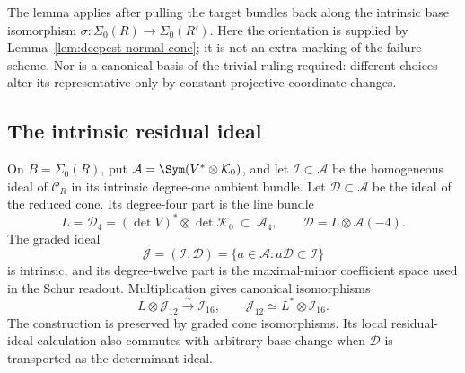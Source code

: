 The lemma applies after pulling the target bundles back along the
intrinsic base isomorphism \(\sigma:\Sigma_0(R)\to\Sigma_0(R')\).
Here the orientation is supplied by
Lemma~\ref{lem:deepest-normal-cone}; it is not an extra marking of
the failure scheme.  Nor is a canonical basis of the trivial ruling
required: different choices alter its representative only by constant
projective coordinate changes.

\subsection{The intrinsic residual ideal}

\begin{lemma}
\label{lem:intrinsic-residual-ideal}
On \(B=\Sigma_0(R)\), put
\(\mathcal A=\Sym(V^*\otimes\mathcal K_0)\), and let
\(\mathcal I\subset\mathcal A\) be the homogeneous ideal of
\(\mathscr C_R\) in its intrinsic degree-one ambient bundle.
Let \(\mathcal D\subset\mathcal A\) be the ideal of the reduced
cone.  Its degree-four part is the line bundle
\begin{equation}\label{eq:determinant-line-bundle}
 L=\mathcal D_4=(\det V)^*\otimes\det\mathcal K_0
                  \ \subset\ \mathcal A_4,
 \qquad \mathcal D=L\otimes\mathcal A(-4).
\end{equation}
The graded ideal
\begin{equation}\label{eq:intrinsic-colon-readout}
 \mathcal J=(\mathcal I:\mathcal D)
   =\{a\in\mathcal A:a\mathcal D\subset\mathcal I\}
\end{equation}
is intrinsic, and its degree-twelve part is the maximal-minor
coefficient space used in the Schur readout.  Multiplication gives
canonical isomorphisms
\begin{equation}\label{eq:twisted-residual-piece}
 L\otimes\mathcal J_{12}\xrightarrow{\sim}\mathcal I_{16},
 \qquad \mathcal J_{12}\simeq L^*\otimes\mathcal I_{16}.
\end{equation}
The construction is preserved by graded cone isomorphisms.  Its
local residual-ideal calculation also commutes with arbitrary base
change when \(\mathcal D\) is transported as the determinant ideal.
\end{lemma}
